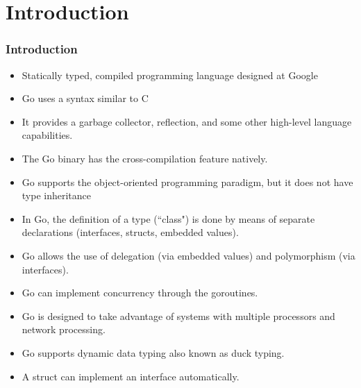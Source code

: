 \section{Introduction}
\frame
{
\frametitle{Introduction}
\begin{itemize}
\item Statically typed, compiled programming language designed at Google
\item Go uses a syntax similar to C
\item It provides a garbage collector, reflection, and some other high-level language capabilities.
\item The Go binary has the cross-compilation feature natively.
\item Go supports the object-oriented programming paradigm, but it does not have type inheritance
\item In Go, the definition of a type (``class") is done by means of separate declarations (interfaces, structs, embedded values).
\item Go allows the use of delegation (via embedded values) and polymorphism (via interfaces).
\item Go can implement concurrency through the goroutines.
\item Go is designed to take advantage of systems with multiple processors and network processing.
\item Go supports dynamic data typing also known as duck typing.
\item A struct can implement an interface automatically. 

\end{itemize}
}
